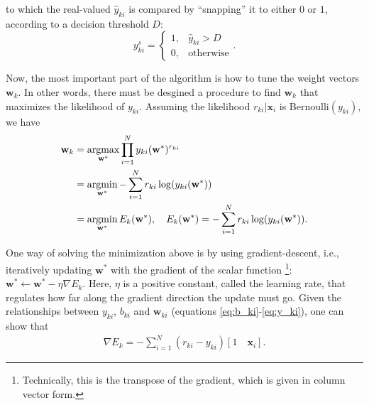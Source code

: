 to which the real-valued $\widehat{y}_{ki}$ is compared by ``snapping'' it to either $0$ or $1$,
according to a decision threshold $D$:
\begin{equation}
    y_{ki}^s = 
    \begin{cases} 
        1, &\widehat{y}_{ki} > D \\
        0, &\text{otherwise}
    \end{cases}.
    \label{eq:ys_ki}
\end{equation}
%

Now, the most important part of the algorithm is how to tune the weight vectors $\mathbf{w}_k$.
In other words, there must be desgined a procedure to find 
$\mathbf{w}_k$ that maximizes the likelihood of $y_{ki}$.
Assuming the likelihood $r_{ki} | \mathbf{x}_i$ is Bernoulli$(y_{ki})$,
we have 
%
\begin{align}
    \mathbf{w}_k 
    &= 
    \mathop{\mathrm{argmax}}\limits_{\mathbf{w}^*}
    \prod_{i=1}^N
    y_{ki}(\mathbf{w}^*)^{r_{ki}} \\
    &= 
    \mathop{\mathrm{argmin}}\limits_{\mathbf{w}^*}
    -\sum_{i=1}^N
    r_{ki}\log(y_{ki}(\mathbf{w}^*)) \\ 
    &=
    \mathop{\mathrm{argmin}}\limits_{\mathbf{w}^*} E_k(\mathbf{w}^*),
    \quad 
    E_k(\mathbf{w}^*) = 
    -\sum_{i=1}^N
    r_{ki}\log(y_{ki}(\mathbf{w}^*)).
    \label{eq:argmin}
\end{align}

One way of solving the minimization above is by using gradient-descent,
i.e., iteratively updating $\mathbf{w}^*$ with the gradient of the scalar function%
\footnote{
    Technically, this is the transpose of the gradient, which is given in column vector form.
}:
$\mathbf{w}^* \leftarrow \mathbf{w}^* - \eta\nabla E_k$.
%
Here, $\eta$ is a positive constant, called the learning rate, 
that regulates how far along the gradient direction the update must go. 
%
Given the relationships between $y_{ki}$, $b_{ki}$ and $\mathbf{w}_{ki}$ 
(equations \eqref{eq:b_ki}-\eqref{eq:y_ki}), one can show that 
%
\begin{align}
    \nabla E_k
    =
    -\sum_{i=1}^N 
    (r_{ki} - y_{ki}) 
    [1\quad \mathbf{x}_i].
    \label{eq:gradient}
\end{align}



